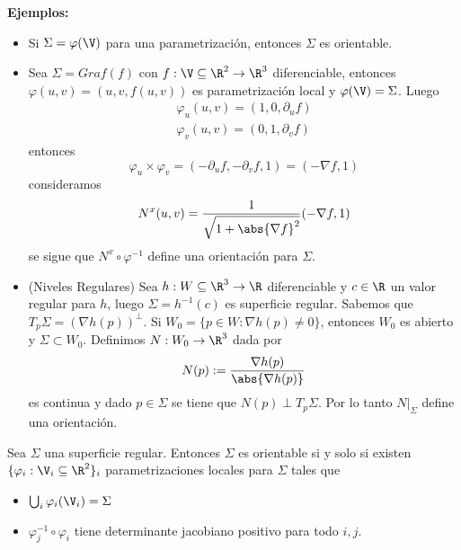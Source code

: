 \documentclass{article}
\begin{document}
\noindent\textbf{Ejemplos:}
\begin{itemize}
    \item Si $\Sigma=\varphi(\V)$ para una parametrización, entonces $\Sigma$ 
    es orientable.

    \item Sea $\Sigma=Graf(f)$ con $f:\V\subseteq\R^{2}\to\R^{3}$ diferenciable, entonces 
    $\varphi(u,v)=(u,v,f(u,v))$ es parametrización local y $\varphi(\V)=\Sigma$. Luego
    \begin{align*}
        \varphi_{u}(u,v)=(1,0,\partial_{u}f) \\
        \varphi_{v}(u,v)=(0,1,\partial_{v}f)
    \end{align*}
    entonces
    \begin{equation*}
        \varphi_{u}\times\varphi_{v}=(-\partial_{u}f,-\partial_{v}f,1)=(-\nabla f,1)
    \end{equation*}
    consideramos
    \begin{equation*}
        N^{x}(u,v)=\frac{1}{\sqrt{1+\abs{\nabla f}^{2}}}(-\nabla f,1)
    \end{equation*}
    se sigue que $N^{x}\circ\varphi^{-1}$ define una orientación para $\Sigma$.

    \item (Niveles Regulares) Sea $h:W\subseteq\R^{3}\to\R$ diferenciable y $c\in\R$ un valor 
    regular para $h$, luego $\Sigma=h^{-1}(c)$ es superficie regular. Sabemos que $T_{p}\Sigma=
    (\nabla h(p))^{\perp}$. Si $W_{0}=\{p\in W:\nabla h(p)\neq0\}$, entonces $W_{0}$ es abierto y
    $\Sigma\subset W_{0}$. Definimos $N:W_{0}\to\R^{3}$ dada por
    \begin{equation*}
        N(p):=\frac{\nabla h(p)}{\abs{\nabla h(p)}}
    \end{equation*}
    es continua y dado $p\in\Sigma$ se tiene que $N(p)\perp T_{p}\Sigma$. Por lo tanto 
    $N\big|_{\Sigma}$ define una orientación.
\end{itemize}

\begin{prop}
    Sea $\Sigma$ una superficie regular. Entonces $\Sigma$ es orientable si y solo si existen
    $\{\varphi_{i}:\V_{i}\subseteq\R^{2}\}_{i}$ parametrizaciones locales para $\Sigma$ tales que
    \begin{itemize}
        \item $\bigcup_{i}\varphi_{i}(\V_{i})=\Sigma$
        \item $\varphi_{j}^{-1}\circ\varphi_{i}$ tiene determinante jacobiano positivo para todo 
        $i,j$.
    \end{itemize}
\end{prop}

\end{document}
